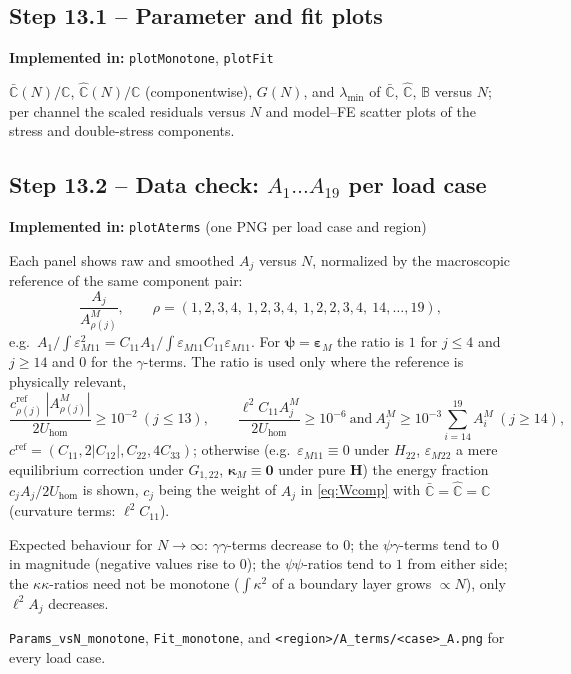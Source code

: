 \documentclass[11pt,a4paper]{article}
\newcommand{\C}{\mathbb{C}}                     %
\newcommand{\Cb}{\bar{\mathbb{C}}}              %
\newcommand{\Ch}{\hat{\mathbb{C}}}              %
\newcommand{\B}{\mathbb{B}}                     %
\newcommand{\epsM}{\bm{\varepsilon}_{M}}
\newcommand{\bpsi}{\bm{\psi}}
\newcommand{\bkap}{\bm{\kappa}}
\newcommand{\bH}{\bm{H}}
\newcommand{\code}[1]{\texttt{#1}}
\theoremstyle{plain}
\theoremstyle{remark}
\newcommand{\implementedin}[1]{\begin{codebox}\textbf{Implemented in:} #1\end{codebox}}
\begin{document}
\subsection*{Step 13.1 -- Parameter and fit plots}
\implementedin{\code{plotMonotone}, \code{plotFit}}
$\Cb(N)/\C$, $\Ch(N)/\C$ (componentwise), $G(N)$, and $\lambda_{\min}$ of $\Cb$, $\Ch$, $\B$ versus
$N$; per channel the scaled residuals versus $N$ and model--FE scatter plots of the stress and
double-stress components.

\subsection*{Step 13.2 -- Data check: $A_1\dots A_{19}$ per load case}
\implementedin{\code{plotAterms} (one PNG per load case and region)}
Each panel shows raw and smoothed $A_j$ versus $N$, normalized by the macroscopic reference of the
same component pair:
\begin{equation}
  \frac{A_j}{A^M_{\rho(j)}},\qquad
  \rho=(1,2,3,4,\ 1,2,3,4,\ 1,2,2,3,4,\ 14,\dots,19),
\end{equation}
e.g.\ $A_1/\int\varepsilon_{M11}^2=C_{11}A_1/\int\varepsilon_{M11}C_{11}\varepsilon_{M11}$. For
$\bpsi=\epsM$ the ratio is $1$ for $j\le4$ and $j\ge14$ and $0$ for the $\gamma$-terms. The ratio
is used only where the reference is physically relevant,
\begin{equation}
  \frac{c^{\mathrm{ref}}_{\rho(j)}\,|A^M_{\rho(j)}|}{2U_{\mathrm{hom}}}\ge10^{-2}\ (j\le13),\qquad
  \frac{\ell^2C_{11}A^M_j}{2U_{\mathrm{hom}}}\ge10^{-6}\ \text{and}\ A^M_j\ge10^{-3}\!\sum_{i=14}^{19}\!A^M_i\ (j\ge14),
\end{equation}
$c^{\mathrm{ref}}=(C_{11},2|C_{12}|,C_{22},4C_{33})$; otherwise (e.g.\ $\varepsilon_{M11}\equiv0$ under
$H_{22}$, $\varepsilon_{M22}$ a mere equilibrium correction under $G_{1,22}$, $\bkap_M\equiv\bm0$ under
pure $\bH$) the energy fraction $c_jA_j/2U_{\mathrm{hom}}$ is shown, $c_j$ being the weight of
$A_j$ in \eqref{eq:Wcomp} with $\Cb=\Ch=\C$ (curvature terms: $\ell^2C_{11}$).

\noindent Expected behaviour for $N\to\infty$: $\gamma\gamma$-terms decrease to $0$; the
$\psi\gamma$-terms tend to $0$ in magnitude (negative values rise to $0$); the $\psi\psi$-ratios tend
to $1$ from either side; the $\kappa\kappa$-ratios need not be monotone ($\int\kappa^2$ of a boundary
layer grows $\propto N$), only $\ell^2A_j$ decreases.
\begin{delivers}
\code{Params\_vsN\_monotone}, \code{Fit\_monotone}, and
\code{<region>/A\_terms/<case>\_A.png} for every load case.
\end{delivers}
\end{document}
